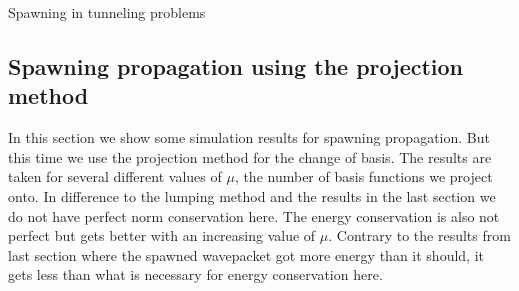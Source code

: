 \begin{chapter}{Spawning in tunneling problems}
\FloatBarrier
\subsection{Spawning propagation using the projection method}

In this section we show some simulation results for spawning propagation. But this
time we use the projection method for the change of basis. The results are taken
for several different values of $\mu$, the number of basis functions we project onto.
In difference to the lumping method and the results in the last section we do not have
perfect norm conservation here. The energy conservation is also not perfect but
gets better with an increasing value of $\mu$. Contrary to the results from last
section where the spawned wavepacket got more energy than it should, it gets less
than what is necessary for energy conservation here.


\end{chapter}
